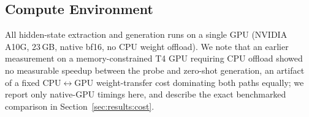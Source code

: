 \subsection{Compute Environment}

\label{sec:experimental_setup:compute}
All hidden-state extraction and generation runs on a single GPU
(NVIDIA A10G, 23\,GB, native bf16, no CPU weight offload). We note that an
earlier measurement on a memory-constrained T4 GPU requiring CPU offload
showed no measurable speedup between the probe and zero-shot generation, an
artifact of a fixed CPU$\leftrightarrow$GPU weight-transfer cost dominating
both paths equally; we report only native-GPU timings here, and describe
the exact benchmarked comparison in
Section~\ref{sec:results:cost}.
